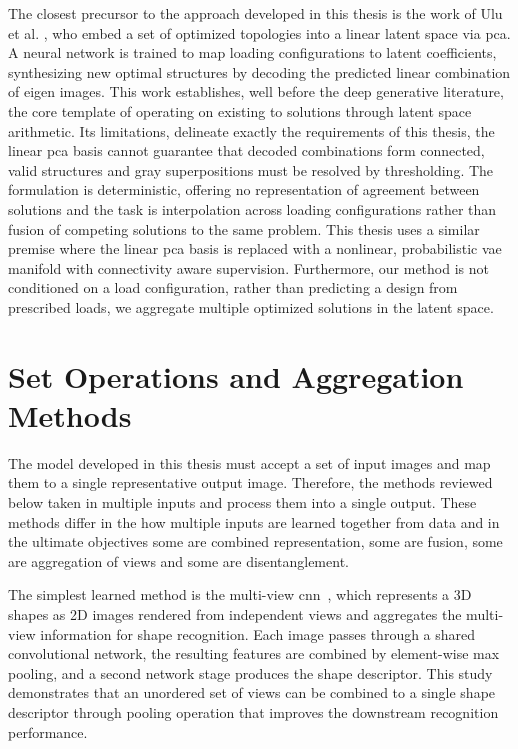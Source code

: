 \documentclass[
  numbers=noenddot,
  english,  %
  a4paper,  %
  twoside,  %
  bibliography=totoc,
  headsepline,
  cleardoublepage=empty,
  parskip=half,
  draft=false
]{scrbook}
\theoremstyle{break}
\begin{document}
The closest precursor to the approach developed in this thesis is the work of Ulu et al. \cite{c20}, who embed a set of optimized topologies into a linear latent space via \gls{pca}. A neural network is trained to map loading configurations to latent coefficients, synthesizing new optimal structures by decoding the predicted linear combination of eigen images. This work establishes, well before the deep generative literature, the core template of operating on existing \gls{to} solutions through latent space arithmetic. Its limitations, delineate exactly the requirements of this thesis, the linear \gls{pca} basis cannot guarantee that decoded combinations form connected, valid structures and gray superpositions must be resolved by thresholding. The formulation is deterministic, offering no representation of agreement between solutions and the task is interpolation across loading configurations rather than fusion of competing solutions to the same problem. This thesis uses a similar premise where the linear \gls{pca} basis is replaced with a nonlinear, probabilistic \gls{vae} manifold with connectivity aware supervision. Furthermore, our method is not conditioned on a load configuration, rather than predicting a design from prescribed loads, we aggregate multiple optimized solutions in the latent space.


\section{Set Operations and Aggregation Methods}\label{sec:relatedwork:dpandto}

The model developed in this thesis must accept a set of input images and map them to a single representative output image. Therefore, the methods reviewed below taken in multiple inputs and process them into a single output. These methods differ in the how multiple inputs are learned together from data and in the ultimate objectives some are combined representation, some are fusion, some are aggregation of views and some are disentanglement. 

The simplest learned method is the multi-view \gls{cnn}~\cite{c22}, which represents a 3D shapes as 2D images rendered from independent views and aggregates the multi-view information for shape recognition. Each image passes through a shared convolutional network, the resulting features are combined by element-wise max pooling, and a second network stage produces the shape descriptor. This study demonstrates that an unordered set of views can be combined to a single shape descriptor through pooling operation that improves the downstream recognition performance. %
\end{document}
